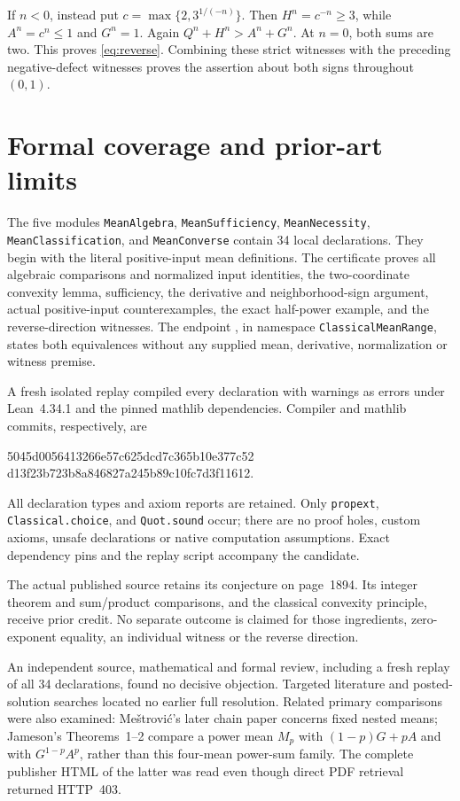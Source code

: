 \documentclass[11pt]{article}
\begin{document}
If $n<0$, instead put $c=\max\{2,3^{1/(-n)}\}$. Then
$H^n=c^{-n}\geq3$, while $A^n=c^n\leq1$ and $G^n=1$.
Again $Q^n+H^n>A^n+G^n$. At $n=0$, both sums are two.
This proves \eqref{eq:reverse}. Combining these strict witnesses
with the preceding negative-defect witnesses proves the assertion
about both signs throughout $(0,1)$.

\clearpage
\section{Formal coverage and prior-art limits}
The five modules \texttt{MeanAlgebra}, \texttt{MeanSufficiency},
\texttt{MeanNecessity}, \texttt{MeanClassification}, and
\texttt{MeanConverse} contain 34 local declarations. They begin with
the literal positive-input mean definitions. The certificate proves
all algebraic comparisons and normalized input identities, the
two-coordinate convexity lemma, sufficiency, the derivative and
neighborhood-sign argument, actual positive-input counterexamples,
the exact half-power example, and the reverse-direction witnesses.
The endpoint , in namespace
\texttt{ClassicalMeanRange}, states both equivalences without any
supplied mean, derivative, normalization or witness premise.

A fresh isolated replay compiled every declaration with warnings as
errors under Lean~4.34.1 and the pinned mathlib dependencies. Compiler
and mathlib commits, respectively, are
\begin{center}\small\ttfamily
5045d0056413266e57c625dcd7c365b10e377c52\\
d13f23b723b8a846827a245b89c10fc7d3f11612.
\end{center}
All declaration types and axiom reports are retained. Only
\texttt{propext}, \texttt{Classical.choice}, and \texttt{Quot.sound}
occur; there are no proof holes, custom axioms, unsafe declarations or
native computation assumptions. Exact dependency pins and the replay
script accompany the candidate.

The actual published source retains its conjecture on page~1894.
Its integer theorem and sum/product comparisons, and the classical
convexity principle, receive prior credit. No separate outcome is
claimed for those ingredients, zero-exponent equality, an individual
witness or the reverse direction.

An independent source, mathematical and formal review, including a
fresh replay of all 34 declarations, found no decisive objection.
Targeted literature and posted-solution searches located no earlier
full resolution. Related primary comparisons were also examined:
Me\v{s}trovi\'c's later chain paper \cite{Chain} concerns fixed nested
means; Jameson's Theorems~1--2 \cite{Jameson} compare a power mean
$M_p$ with $(1-p)G+pA$ and with $G^{1-p}A^p$, rather than this
four-mean power-sum family. The complete publisher HTML of the latter
was read even though direct PDF retrieval returned HTTP~403.
\end{document}
